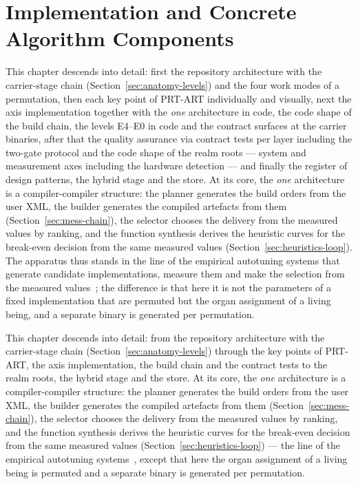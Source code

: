 \chapter{Implementation and Concrete Algorithm Components}\label{ch:impl}

\begin{nurlang}
This chapter descends into detail: first the repository architecture with the carrier-stage chain
(Section~\ref{sec:anatomy-levels}) and the four work modes of a permutation, then each key point of
PRT-ART individually and visually, next the axis implementation together with the \emph{one} architecture
in code, the code shape of the build chain, the levels E4--E0 in code and the contract surfaces at the
carrier binaries, after that the quality assurance via contract tests per layer including the two-gate
protocol and the code shape of the realm roots --- system and measurement axes including the hardware
detection --- and finally the register of design patterns, the hybrid stage and the store. At its core, the
\emph{one} architecture is a compiler-compiler structure: the planner generates the build orders from the
user XML, the builder generates the compiled artefacts from them (Section~\ref{sec:mess-chain}),
the selector chooses the delivery from the measured values by ranking, and the function synthesis derives the
heuristic curves for the break-even decision from the same measured values
(Section~\ref{sec:heuristics-loop}). The apparatus thus stands
in the line of the empirical autotuning systems that generate candidate implementations, measure them and
make the selection from the measured
values~\cite{whaley2001atlas,frigo1998fftw,ansel2014opentuner,balaprakash2018autotuning}; the difference
is that here it is not the parameters of a fixed implementation that are permuted but the organ assignment
of a living being, and a separate binary is generated per permutation.
\end{nurlang}
\begin{nurkurz}
This chapter descends into detail: from the repository architecture with the carrier-stage chain
(Section~\ref{sec:anatomy-levels}) through the key points of PRT-ART, the axis implementation, the build
chain and the contract tests to the realm roots, the hybrid stage and the store. At its core, the
\emph{one} architecture is a compiler-compiler structure: the planner generates the build orders from the
user XML, the builder generates the compiled artefacts from them (Section~\ref{sec:mess-chain}),
the selector chooses the delivery from the measured values by ranking, and the function synthesis derives the
heuristic curves for the break-even decision from the same measured values
(Section~\ref{sec:heuristics-loop}) --- the line of
the empirical autotuning
systems~\cite{whaley2001atlas,frigo1998fftw,ansel2014opentuner,balaprakash2018autotuning}, except that
here the organ assignment of a living being is permuted and a separate binary is generated per
permutation.
\end{nurkurz}

